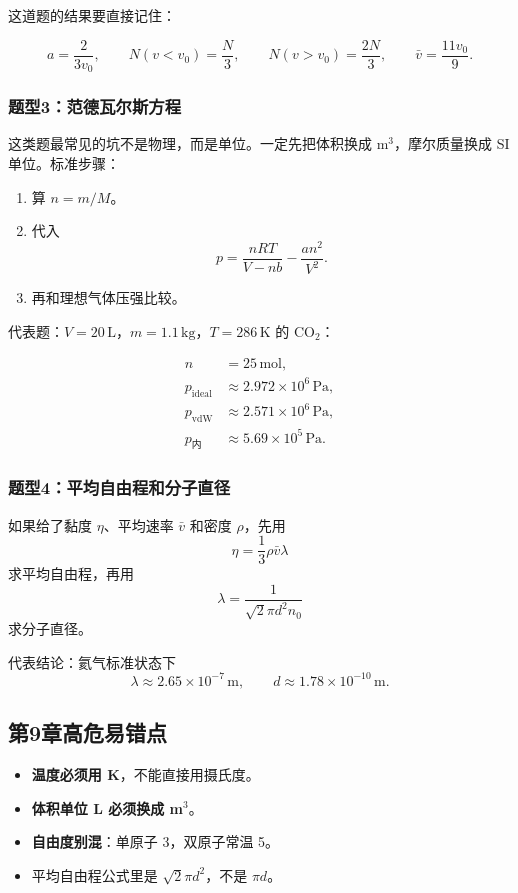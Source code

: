 \documentclass[12pt,a4paper]{article}
\newcommand{\warn}[1]{\textcolor{red!70!black}{\textbf{#1}}}
\begin{document}
这道题的结果要直接记住：

\[
a=\frac{2}{3v_0},\qquad
N(v<v_0)=\frac{N}{3},\qquad
N(v>v_0)=\frac{2N}{3},\qquad
\bar v=\frac{11v_0}{9}.
\]

\subsubsection*{题型3：范德瓦尔斯方程}

这类题最常见的坑不是物理，而是单位。一定先把体积换成 $\mathrm{m^3}$，摩尔质量换成 SI 单位。标准步骤：

\begin{enumerate}
  \item 算 $n=m/M$。
  \item 代入
  \[
  p=\frac{nRT}{V-nb}-\frac{an^2}{V^2}.
  \]
  \item 再和理想气体压强比较。
\end{enumerate}

代表题：$V=20\,\mathrm{L}$，$m=1.1\,\mathrm{kg}$，$T=286\,\mathrm{K}$ 的 CO$_2$：

\begin{align*}
n &= 25\,\mathrm{mol},\\
p_{\text{ideal}} &\approx 2.972\times 10^6\,\mathrm{Pa},\\
p_{\text{vdW}} &\approx 2.571\times 10^6\,\mathrm{Pa},\\
p_{\text{内}} &\approx 5.69\times 10^5\,\mathrm{Pa}.
\end{align*}

\subsubsection*{题型4：平均自由程和分子直径}

如果给了黏度 $\eta$、平均速率 $\bar v$ 和密度 $\rho$，先用
\[
\eta=\frac13 \rho \bar v \lambda
\]
求平均自由程，再用
\[
\lambda=\frac{1}{\sqrt{2}\pi d^2 n_0}
\]
求分子直径。

代表结论：氦气标准状态下
\[
\lambda \approx 2.65\times 10^{-7}\,\mathrm{m},\qquad
d\approx 1.78\times 10^{-10}\,\mathrm{m}.
\]

\subsection{第9章高危易错点}

\begin{itemize}
  \item \warn{温度必须用 K}，不能直接用摄氏度。
  \item \warn{体积单位 L 必须换成 m$^3$}。
  \item \warn{自由度别混}：单原子 3，双原子常温 5。
  \item 平均自由程公式里是 $\sqrt{2}\pi d^2$，不是 $\pi d$。
\end{itemize}
\end{document}
